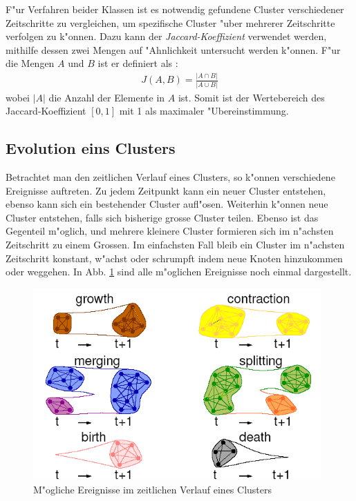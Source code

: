 \documentclass[journal]{vgtc}
\begin{document}
  F"ur Verfahren beider Klassen ist es notwendig gefundene Cluster verschiedener Zeitschritte zu vergleichen, um spezifische Cluster "uber
  mehrerer Zeitschritte verfolgen zu k"onnen. Dazu kann der \emph{Jaccard-Koeffizient} verwendet werden, mithilfe dessen zwei Mengen auf "Ahnlichkeit
  untersucht werden k"onnen. F"ur die Mengen $A$ und $B$ ist er definiert als \cite{timestep}:
  \begin{align}
    J(A,B)=\frac{|A \cap B|}{|A \cup B|}
  \end{align}
  wobei $|A|$ die Anzahl der Elemente in $A$ ist. Somit ist der Wertebereich des Jaccard-Koeffizient $[0,1]$ mit 1 als maximaler "Ubereinstimmung.
  
  \subsection{Evolution eins Clusters}
    \label{sec:evolution}
    Betrachtet man den zeitlichen Verlauf eines Clusters, so k"onnen verschiedene Ereignisse auftreten. Zu jedem Zeitpunkt kann ein neuer Cluster
    entstehen, ebenso kann sich ein bestehender Cluster aufl"osen. Weiterhin k"onnen neue Cluster entstehen, falls sich bisherige grosse Cluster
    teilen. Ebenso ist das Gegenteil m"oglich, und mehrere kleinere Cluster formieren sich im n"achsten Zeitschritt zu einem Grossen.
    Im einfachsten Fall bleib ein Cluster im n"achsten Zeitschritt konstant, w"achst oder schrumpft indem neue Knoten hinzukommen oder weggehen.
    In Abb. \ref{fig:evolution} sind alle m"oglichen Ereignisse noch einmal dargestellt.
    \begin{figure}[t]
      \centering
      \includegraphics[width=11cm]{images/evolution_alone}
      \caption{M"ogliche Ereignisse im zeitlichen Verlauf eines Clusters \cite{CPM_time}}
      \label{fig:evolution}
    \end{figure}
\end{document}
